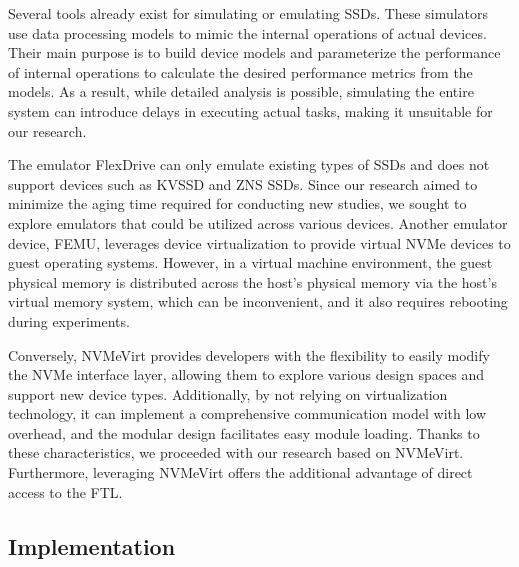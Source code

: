 Several tools already exist for simulating or emulating SSDs.
These simulators use data processing models to mimic the internal operations of actual devices.
Their main purpose is to build device models and parameterize the performance of internal operations to calculate the desired performance metrics from the models.
As a result, while detailed analysis is possible, simulating the entire system can introduce delays in executing actual tasks, making it unsuitable for our research.

The emulator FlexDrive can only emulate existing types of SSDs and does not support devices such as KVSSD and ZNS SSDs.
Since our research aimed to minimize the aging time required for conducting new studies, we sought to explore emulators that could be utilized across various devices.
Another emulator device, FEMU, leverages device virtualization to provide virtual NVMe devices to guest operating systems.
However, in a virtual machine environment, the guest physical memory is distributed across the host's physical memory via the host's virtual memory system, which can be inconvenient, and it also requires rebooting during experiments.



Conversely, NVMeVirt provides developers with the flexibility to easily modify the NVMe interface layer, allowing them to explore various design spaces and support new device types.
Additionally, by not relying on virtualization technology, it can implement a comprehensive communication model with low overhead, and the modular design facilitates easy module loading.
Thanks to these characteristics, we proceeded with our research based on NVMeVirt.
Furthermore, leveraging NVMeVirt offers the additional advantage of direct access to the FTL.

\subsection{Implementation}

